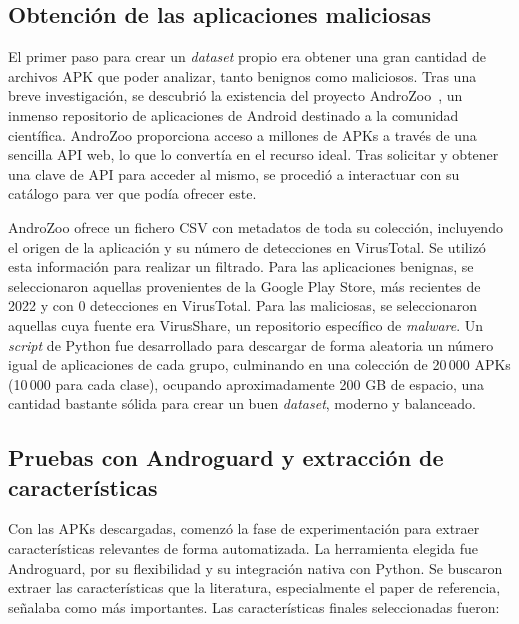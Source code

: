 \subsection{Obtención de las aplicaciones maliciosas}

El primer paso para crear un \textit{dataset} propio era obtener una gran cantidad de archivos APK que poder analizar, tanto benignos como maliciosos. Tras una breve investigación, se descubrió la existencia del proyecto AndroZoo~\cite{Allix:2016:ACM:2901739.2903508}, un inmenso repositorio de aplicaciones de Android destinado a la comunidad científica. AndroZoo proporciona acceso a millones de APKs a través de una sencilla API web, lo que lo convertía en el recurso ideal. Tras solicitar y obtener una clave de API para acceder al mismo, se procedió a interactuar con su catálogo para ver que podía ofrecer este.

AndroZoo ofrece un fichero CSV con metadatos de toda su colección, incluyendo el origen de la aplicación y su número de detecciones en VirusTotal. Se utilizó esta información para realizar un filtrado. Para las aplicaciones benignas, se seleccionaron aquellas provenientes de la Google Play Store, más recientes de 2022 y con 0 detecciones en VirusTotal. Para las maliciosas, se seleccionaron aquellas cuya fuente era VirusShare, un repositorio específico de \textit{malware}. Un \textit{script} de Python fue desarrollado para descargar de forma aleatoria un número igual de aplicaciones de cada grupo, culminando en una colección de 20\,000 APKs (10\,000 para cada clase), ocupando aproximadamente 200 GB de espacio, una cantidad bastante sólida para crear un buen \textit{dataset}, moderno y balanceado.

\subsection{Pruebas con Androguard y extracción de características}

Con las APKs descargadas, comenzó la fase de experimentación para extraer características relevantes de forma automatizada. La herramienta elegida fue Androguard, por su flexibilidad y su integración nativa con Python. Se buscaron extraer las características que la literatura, especialmente el paper de referencia, señalaba como más importantes. Las características finales seleccionadas fueron:

